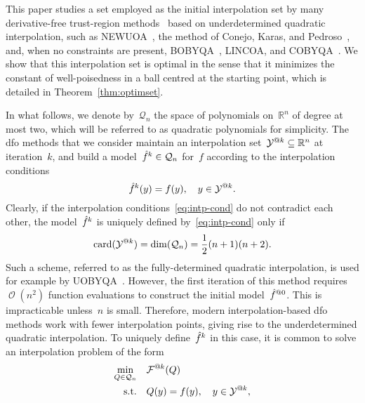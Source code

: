 \documentclass{article}
\makeatletter
\newcounter{cite}
\numberwithin{equation}{section}
\theoremstyle{definition}
\theoremstyle{plain}
\theoremstyle{remark}
\DeclareMathOperator{\bigo}{\mathcal{O}}
\DeclareMathOperator{\card}{card}
\newcommand*{\obj}{f}
\newcommand*{\objm}[1][]{\hat{\obj}\ifblank{#1}{}{^{#1}}}
\newcommand*{\R}{\mathbb{R}}
\newcommand*{\xpt}[1][]{\mathcal{Y}\ifblank{#1}{}{^{@#1}}}
\newcommand*{\qpoly}{\mathcal{Q}_n}
\newcommand{\reviewed}[1]{\texorpdfstring{{\color{NavyBlue}#1}}{#1}}
\makeatother
\begin{document}
This paper studies a set employed as the initial interpolation set by many derivative-free trust-region methods~\cite{Conn_Gould_Toint_2000,Yuan_2015} based on underdetermined quadratic interpolation, such as NEWUOA~\cite{Powell_2006}, \reviewed{the method of Conejo, Karas, and Pedroso~\cite{Conejo_Karas_Pedroso_2015},} and, when no constraints are present, BOBYQA~\cite{Powell_2009}, LINCOA, and COBYQA~\cite{Ragonneau_2022,Ragonneau_Zhang_2023}.
We show that this interpolation set is optimal in the sense that it minimizes the constant of well-poisedness in a ball centred at the starting point, which is detailed in Theorem~\ref{thm:optimset}.

In what follows, we denote by~$\qpoly$ the space of polynomials on~$\R^n$ of degree at most two, which will be referred to as quadratic polynomials for simplicity.
The \gls{dfo} methods that we consider maintain an interpolation set~$\xpt[k] \subseteq \R^n$ at iteration~$k$, and build a model~$\objm[k] \in \qpoly$ for~$\obj$ according to the interpolation conditions
\begin{equation}
    \label{eq:intp-cond}
    \objm[k](y) = \obj(y), \quad y \in \xpt[k].
\end{equation}
Clearly, if the interpolation conditions~\eqref{eq:intp-cond} do not contradict each other, \reviewed{the model}~$\objm[k]$ is uniquely defined by~\eqref{eq:intp-cond} only if
\begin{equation*}
    \card(\xpt[k]) = \dim(\qpoly) = \frac{1}{2} (n + 1) (n + 2).
\end{equation*}
Such a scheme, referred to as the fully-determined quadratic interpolation, is used \reviewed{for example} by UOBYQA~\cite{Powell_2002}.
However, the first iteration of this method requires~$\bigo(n^2)$ function evaluations to construct the initial model~$\objm[@0]$.
This \reviewed{is impracticable} unless~$n$ is small.
Therefore, modern interpolation-based \gls{dfo} methods work with fewer interpolation points, giving rise to the underdetermined quadratic interpolation.
To uniquely define~$\objm[k]$ in this case, it is common to solve an interpolation problem of the form
\begin{equation}
    \label{eq:intp-var}
    \begin{aligned}
        \min_{Q \in \qpoly} & \quad \mathcal{F}^{@k}(Q)\\
        \text{s.t.}         & \quad Q(y) = \obj(y), \quad y \in \xpt[k],
    \end{aligned}
\end{equation}
\end{document}
